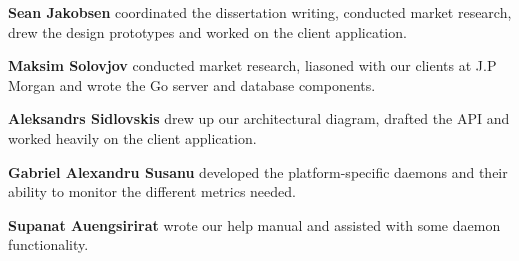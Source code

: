 \documentclass{l3proj}
\begin{document}
\textbf{Sean Jakobsen} coordinated the dissertation writing, conducted market research, drew the design prototypes and worked on the client application. 

\textbf{Maksim Solovjov} conducted market research, liasoned with our clients at J.P Morgan and wrote the Go server and database components.

\textbf{Aleksandrs Sidlovskis} drew up our architectural diagram, drafted the API and worked heavily on the client application.

\textbf{Gabriel Alexandru Susanu} developed the platform-specific daemons and their ability to monitor the different metrics needed.

\textbf{Supanat Auengsirirat} wrote our help manual and assisted with some daemon functionality.


\end{document}

